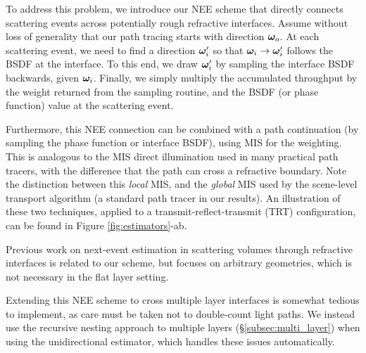 To address this problem, we introduce our NEE scheme that directly connects scattering events across potentially rough refractive interfaces.
Assume without loss of generality that our path tracing starts with direction $\bm{\omega}_o$.
At each scattering event, we need to find a direction $\bm{\omega}_i'$ so that $\bm{\omega}_i \to \bm{\omega}_i'$ follows the BSDF at the interface.
To this end, we draw $\bm{\omega}_i'$ by sampling the interface BSDF backwards, given $\bm{\omega}_i$.
Finally, we simply multiply the accumulated throughput by the weight returned from the sampling routine, and the BSDF (or phase function) value at the scattering event.

Furthermore, this NEE connection can be combined with a path continuation (by sampling the phase function or interface BSDF), using MIS for the weighting. This is analogous to the MIS direct illumination used in many practical path tracers, with the difference that the path can cross a refractive boundary. Note the distinction between this \emph{local} MIS, and the \emph{global} MIS used by the scene-level transport algorithm (a standard path tracer in our results). An illustration of these two techniques, applied to a transmit-reflect-transmit (TRT) configuration, can be found in Figure \ref{fig:estimators}-ab.

Previous work on next-event estimation in scattering volumes through refractive interfaces \cite{Walter2009,Koerner2016} is related to our scheme, but focuses on arbitrary geometries, which is not necessary in the flat layer setting.

Extending this NEE scheme to cross multiple layer interfaces is somewhat tedious to implement, as care must be taken not to double-count light paths. We instead use the recursive nesting approach to multiple layers (\S\ref{subsec:multi_layer}) when using the unidirectional estimator, which handles these issues automatically.


